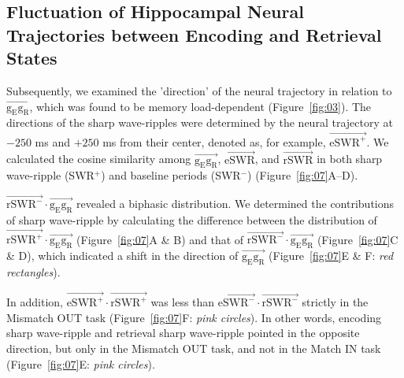 \subsection{Fluctuation of Hippocampal Neural Trajectories between Encoding and Retrieval States}
Subsequently, we examined the 'direction' of the neural trajectory in relation to $\overrightarrow{\mathrm{g_{E}g_{R}}}$, which was found to be memory load-dependent (Figure~\ref{fig:03}). The directions of the sharp wave-ripples were determined by the neural trajectory at $-250$ ms and $+250$ ms from their center, denoted as, for example, $\overrightarrow{\mathrm{eSWR^+}}$. We calculated the cosine similarity among $\overrightarrow{\mathrm{g_{E}g_{R}}}$, $\overrightarrow{\mathrm{eSWR}}$, and $\overrightarrow{\mathrm{rSWR}}$ in both sharp wave-ripple (SWR$^+$) and baseline periods (SWR$^-$) (Figure~\ref{fig:07}A--D).

$\overrightarrow{\mathrm{rSWR^-}} \cdot \overrightarrow{\mathrm{g_{E}g_{R}}}$ revealed a biphasic distribution. We determined the contributions of sharp wave-ripple by calculating the difference between the distribution of $\overrightarrow{\mathrm{rSWR^+}} \cdot \overrightarrow{\mathrm{g_{E}g_{R}}}$ (Figure~\ref{fig:07}A \& B) and that of $\overrightarrow{\mathrm{rSWR^-}} \cdot \overrightarrow{\mathrm{g_{E}g_{R}}}$ (Figure~\ref{fig:07}C \& D), which indicated a shift in the direction of $\overrightarrow{\mathrm{g_{E}g_{R}}}$ (Figure~\ref{fig:07}E \& F: \textit{red rectangles}).

In addition, $\overrightarrow{\mathrm{eSWR^+}} \cdot \overrightarrow{\mathrm{rSWR^+}}$ was less than $\overrightarrow{\mathrm{eSWR^-}} \cdot \overrightarrow{\mathrm{rSWR^-}}$ strictly in the Mismatch OUT task (Figure~\ref{fig:07}F: \textit{pink circles}). In other words, encoding sharp wave-ripple and retrieval sharp wave-ripple pointed in the opposite direction, but only in the Mismatch OUT task, and not in the Match IN task (Figure~\ref{fig:07}E: \textit{pink circles}).
\label{sec:results}